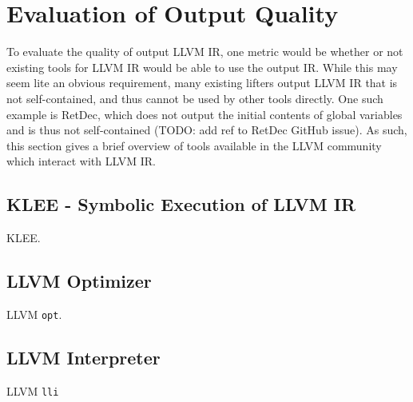 


\section{Evaluation of Output Quality}

To evaluate the quality of output LLVM IR, one metric would be whether or not existing tools for LLVM IR would be able to use the output IR. While this may seem lite an obvious requirement, many existing lifters output LLVM IR that is not self-contained, and thus cannot be used by other tools directly. One such example is RetDec, which does not output the initial contents of global variables and is thus not self-contained (TODO: add ref to RetDec GitHub issue). As such, this section gives a brief overview of tools available in the LLVM community which interact with LLVM IR.


\subsection{KLEE - Symbolic Execution of LLVM IR}

KLEE.


\subsection{LLVM Optimizer}

LLVM \texttt{opt}.


\subsection{LLVM Interpreter}

LLVM \texttt{lli}
